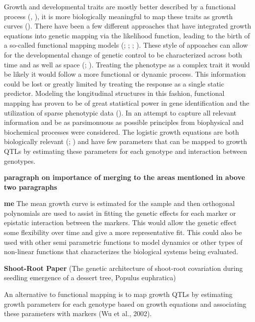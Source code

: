 \documentclass[11pt,]{book}
\theoremstyle{definition}
\theoremstyle{definition}
\theoremstyle{remark}
\begin{document}
Growth and developmental traits are mostly better described by a
functional process (\cite{hernandez2015understanding},
\cite{muraya2017genetic}), it is more biologically meaningful to map
these traits as growth curves (\cite{sun2015mapping}). There have been a
few different approaches that have integrated growth equations into
genetic mapping via the likelihood function, leading to the birth of a
so-called functional mapping models (\cite{ma2002functional};
\cite{wu2006functional}; \cite{li2015dynamic};
\cite{muraya2017genetic}). These style of appoaches can allow for the
developmental change of genetic control to be characterized across both
time and as well as space (\cite{he2010mapping};
\cite{li2010functional}). Treating the phenotype as a complex trait it
would be likely it would follow a more functional or dynamic process.
This information could be lost or greatly limited by treating the
response as a single static predictor. Modeling the longitudinal
structures in this fashion, functional mapping has proven to be of great
statistical power in gene identification and the utilization of sparse
phenotypic data (\cite{hou2006framework}). In an attempt to capture all
relevant information and be as parsimonuous as possible principles from
biophysical and biochemical processes were considered. The logistic
growth equations are both biologically relevant (\cite{west2001general};
\cite{sun2014model}) and have few parameters that can be mapped to
growth QTLs by estimating these parameters for each genotype and
interaction between genotypes.

\textbf{paragraph on importance of merging to the areas mentioned in
above two paragraphs}

\textbf{me} The mean growth curve is estimated for the sample and then
orthogonal polynomials are used to assist in fitting the genetic effects
for each marker or epistatic interaction between the markers. This would
allow the genetic effect some flexibility over time and give a more
representative fit. This could also be used with other semi parametric
functions to model dynamics or other types of non-linear functions that
characterizes the biological systems being evaluated.

\textbf{Shoot-Root Paper} (The genetic architecture of shoot-root
covariation during seedling emergence of a dessert tree, Populus
euphratica)

An alternative to functional mapping is to map growth QTLs by estimating
growth parameters for each genotype based on growth equations and
associating these parameters with markers (Wu et al., 2002).
\end{document}
